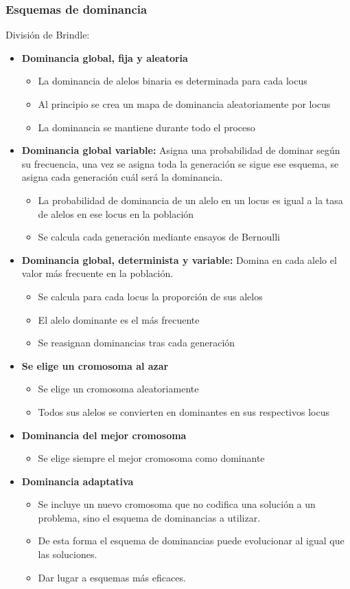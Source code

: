 \documentclass[12pt, twoside, openright]{report} %
\begin{document}
\subsubsection{Esquemas de dominancia}
División de Brindle:
\begin{itemize}
	\item \textbf{Dominancia global, fija y aleatoria}
	\begin{itemize}
		\item La dominancia de alelos binaria es determinada para cada locus
		\item Al principio se crea un mapa de dominancia aleatoriamente por locus
		\item La dominancia se mantiene durante todo el proceso
	\end{itemize}
	\item \textbf{Dominancia global variable:} Asigna una probabilidad de dominar según su frecuencia, una vez se asigna toda la generación se sigue ese esquema, se asigna cada generación cuál será la dominancia.
	\begin{itemize}
		\item La probabilidad de dominancia de un alelo en un locus es igual a la tasa de alelos en ese locus en la población
		\item Se calcula cada generación mediante ensayos de Bernoulli
	\end{itemize}
	\item \textbf{Dominancia global, determinista y variable:} Domina en cada alelo el valor más frecuente en la población.
	\begin{itemize}
		\item Se calcula para cada locus la proporción de sus alelos
		\item El alelo dominante es el más frecuente
		\item Se reasignan dominancias tras cada generación
	\end{itemize}
	\item \textbf{Se elige un cromosoma al azar}
	\begin{itemize}
		\item Se elige un cromosoma aleatoriamente
		\item Todos sus alelos se convierten en dominantes en sus respectivos locus
	\end{itemize}
	\item \textbf{Dominancia del mejor cromosoma}
	\begin{itemize}
		\item Se elige siempre el mejor cromosoma como dominante
	\end{itemize}
	\item \textbf{Dominancia adaptativa}
	\begin{itemize}
		\item Se incluye un nuevo cromosoma que no codifica una solución a un problema, sino el esquema de dominancias a utilizar.
		\item De esta forma el esquema de dominancias puede evolucionar al igual que las soluciones.
		\item Dar lugar a esquemas más eficaces.
	\end{itemize}
\end{itemize}
\end{document}
